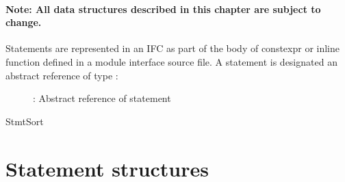 \label{sec:ifc-statements}

\paragraph{Note: All data structures described in this chapter are subject to change.}

Statements are represented in an IFC as part of the body of constexpr or inline function defined in a
module interface source file.  A statement is designated an abstract reference of type :
\begin{figure}[H]
  \centering
  \caption{: Abstract reference of statement}
  \label{fig:ifc-stmt-index}
\end{figure}

\begin{SortEnum}{StmtSort}
\end{SortEnum}

\section{Statement structures}
\label{sec:ifc-ststement-structures}

\subsection{}
\label{sec:ifc:StmtSort:VendorExtension}



\subsection{}
\label{sec:ifc:StmtSort:Try}

